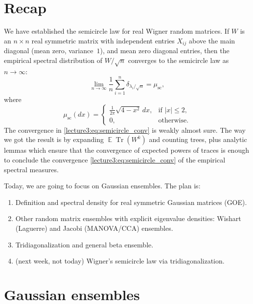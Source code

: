 \documentclass[letterpaper,11pt,oneside,reqno]{book}
\numberwithin{equation}{chapter}  %
\theoremstyle{definition}
\begin{document}
\section{Recap}

We have established the semicircle law for
real Wigner random matrices.
If $W$ is an $n\times n$ real symmetric matrix with
independent entries $X_{ij}$ above the main diagonal
(mean zero, variance~$1$), and mean zero diagonal entries,
then the empirical spectral distribution of $W/\sqrt{n}$
converges to the semicircle law as $n\to\infty$:
\begin{equation}
	\label{lecture3:eq:semicircle_conv}
	\lim_{n\to\infty} \frac{1}{n} \sum_{i=1}^n \delta_{\lambda_i/\sqrt n} =
	\mu_{\mathrm{sc}},
\end{equation}
where
\begin{equation*}
	\mu_{\mathrm{sc}}(dx) = \begin{cases}
		\frac{1}{2\pi} \sqrt{4-x^2} \, dx, & \text{if } |x|\le 2, \\
		0, & \text{otherwise}.
	\end{cases}
\end{equation*}
The convergence
in \eqref{lecture3:eq:semicircle_conv} is weakly almost sure.
The way we got the result is by expanding
$\operatorname{\mathbb{E}}\operatorname{Tr} (W^k)$ and counting
trees, plus analytic lemmas which ensure that
the convergence of expected powers of traces is enough
to conclude the convergence
\eqref{lecture3:eq:semicircle_conv}
of the empirical spectral measures.

\medskip

Today, we are going to focus on Gaussian ensembles. The plan is:
\begin{enumerate}[$\bullet$]
	\item Definition and spectral density for real symmetric Gaussian matrices (GOE).
	\item Other random matrix ensembles with explicit eigenvalue densities:
		Wishart (Laguerre) and Jacobi (MANOVA/CCA) ensembles.
	\item Tridiagonalization and general beta ensemble.
	\item (next week, not today) Wigner's semicircle law via tridiagonalization.
\end{enumerate}

\section{Gaussian ensembles}
\end{document}
